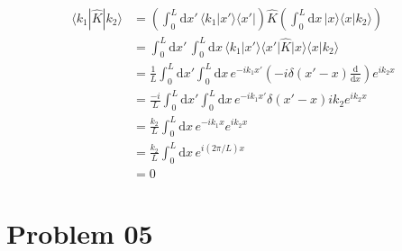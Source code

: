 \documentclass[letter]{article}
\begin{document}
\begin{align*}
\langle k_1 | \hat{K} | k_2 \rangle &= 
\left(
	\int_{0}^{L}  
\mathrm{d} x' \, 
\langle k_1 | x' \rangle \langle x' |  
\right)
\hat{K} 
\left(
\int_{0}^{L} \mathrm{d} x \, 
| x \rangle \langle x | k_2 \rangle 
\right)
\\	
&= 
\int_{0}^{L} \mathrm{d} x' \, 
\int_{0}^{L}  \mathrm{d} x \, 
\langle k_1 | x' \rangle 
\langle x' | \hat{K} | x \rangle 
\langle x | k_2 \rangle 
\\
&= \frac{1}{L}
\int_{0}^{L} \mathrm{d} x'
\int_{0}^{L} \mathrm{d} x 
\, 
e^{-i k_1 x'} \left(- i \delta(x' - x) \frac{\mathrm{d} }{\mathrm{d} x}\right) e^{i k_2 x }
\\
&= \frac{-i}{L}
\int_{0}^{L} \mathrm{d} x'
\int_{0}^{L} \mathrm{d} x 
\, 
e^{-i k_1 x'} \delta(x' - x) i k_2 e^{i k_2 x }
\\
&= \frac{k_2}{L}
\int_{0}^{L} \mathrm{d} x 
\, 
e^{-i k_1 x}   e^{i k_2 x }
\\
&= 
\frac{k_2}{L} 
\int_{0}^{L} 
\mathrm{d} x \, e^{i \left(2 \pi / L\right) x}
\\
&= 0 
\end{align*}


\section*{Problem 05} 
\end{document}
